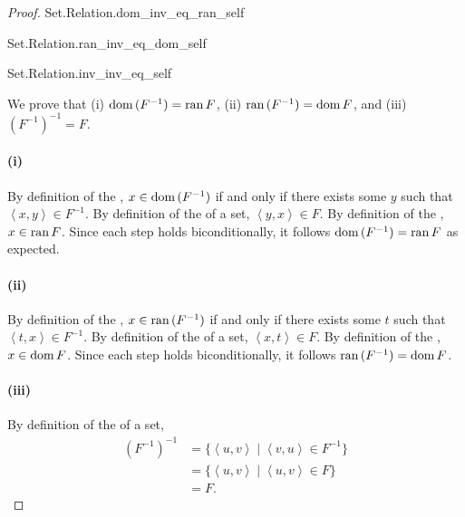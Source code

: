 \documentclass{report}
\begin{document}
\begin{proof}

  \statementpadding

    {Set.Relation.dom\_inv\_eq\_ran\_self}

    {Set.Relation.ran\_inv\_eq\_dom\_self}

    {Set.Relation.inv\_inv\_eq\_self}

  We prove that (i) $\mathop{\text{dom}}{(F^{-1})} = \mathop{\text{ran}}{F}$, (ii) $\mathop{\text{ran}}{(F^{-1})} = \mathop{\text{dom}}{F}$,
    and (iii) $(F^{-1})^{-1} = F$.

  \paragraph{(i)}%

    By definition of the , $x \in \mathop{\text{dom}}{(F^{-1})}$ if and
      only if there exists some $y$ such that $\left< x, y \right> \in F^{-1}$.
    By definition of the  of a set,
      $\left< y, x \right> \in F$.
    By definition of the , $x \in \mathop{\text{ran}}{F}$.
    Since each step holds biconditionally, it follows
      $\mathop{\text{dom}}{(F^{-1})} = \mathop{\text{ran}}{F}$ as expected.

  \paragraph{(ii)}%

    By definition of the , $x \in \mathop{\text{ran}}{(F^{-1})}$ if and
      only if there exists some $t$ such that $\left< t, x \right> \in F^{-1}$.
    By definition of the  of a set,
      $\left< x, t \right> \in F$.
    By definition of the , $x \in \mathop{\text{dom}}{F}$.
    Since each step holds biconditionally, it follows
      $\mathop{\text{ran}}{(F^{-1})} = \mathop{\text{dom}}{F}$.

  \paragraph{(iii)}%

    By definition of the  of a set,
      \begin{align*}
        (F^{-1})^{-1}
          & = \{\left< u, v \right> \mid \left< v, u \right> \in F^{-1}\} \\
          & = \{\left< u, v \right> \mid \left< u, v \right> \in F\} \\
          & = F.
      \end{align*}

\end{proof}
\end{document}
